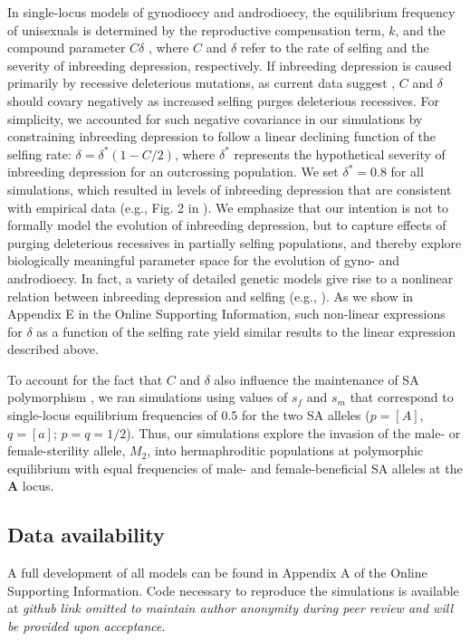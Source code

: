 \documentclass{article}
\begin{document}
In single-locus models of gynodioecy and androdioecy, the equilibrium frequency of unisexuals is determined by the reproductive compensation term, $k$, and the compound parameter $C \delta$ \citep{Charlesworth1978a}, where $C$ and $\delta$ refer to the rate of selfing and the severity of inbreeding depression, respectively. If inbreeding depression is caused primarily by recessive deleterious mutations, as current data suggest \citep{Charlesworth2009}, $C$ and $\delta$ should covary negatively as increased selfing purges deleterious recessives. For simplicity, we accounted for such negative covariance in our simulations by constraining inbreeding depression to follow a linear declining function of the selfing rate: $\delta = \delta^\ast(1 - C/2)$, where $\delta^\ast$ represents the hypothetical severity of inbreeding depression for an outcrossing population. We set $\delta^\ast = 0.8$ for all simulations, which resulted in levels of inbreeding depression that are consistent with empirical data (e.g., Fig. 2 in \citealt{HusbandSchemske1996}). We emphasize that our intention is not to formally model the evolution of inbreeding depression, but to capture effects of purging deleterious recessives in partially selfing populations, and thereby explore biologically meaningful parameter space for the evolution of gyno- and androdioecy. In fact, a variety of detailed genetic models give rise to a nonlinear relation between inbreeding depression and selfing (e.g., \citealt{OhtaCockerham1974, LandeSchemske1985, Charlesworth1985, Garcia-Dorado2017, LandePorcher2017}). As we show in Appendix E in the Online Supporting Information, such non-linear expressions for $\delta$ as a function of the selfing rate yield similar results to the linear expression described above. 

To account for the fact that $C$ and $\delta$ also influence the maintenance of SA polymorphism \citep{JordanConnallon2014,Olito2016}, we ran simulations using values of $s_f$ and $s_m$ that correspond to single-locus equilibrium frequencies of $0.5$ for the two SA alleles ($p = [A]$, $q = [a]$; $p=q=1/2$). Thus, our simulations explore the invasion of the male- or female-sterility allele, $M_2$, into hermaphroditic populations at polymorphic equilibrium with equal frequencies of male- and female-beneficial SA alleles at the $\mathbf{A}$ locus.


\subsection*{Data availability}
A full development of all models can be found in Appendix A of the Online Supporting Information. Code necessary to reproduce the simulations is available at \textit{github link omitted to maintain author anonymity during peer review and will be provided upon acceptance}.%
\end{document}
